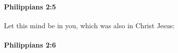 		\paragraph{Philippians 2:5} %
			\label{PHILIPPIANS-2-5}

			Let this mind be in you, which was also in Christ Jesus:

			\begin{framed}
			\scriptsize
				\begin{compactdesc}
					\item[SBLG] 
				\end{compactdesc}
			\end{framed}

		\paragraph{Philippians 2:6} %
			\label{PHILIPPIANS-2-6}

